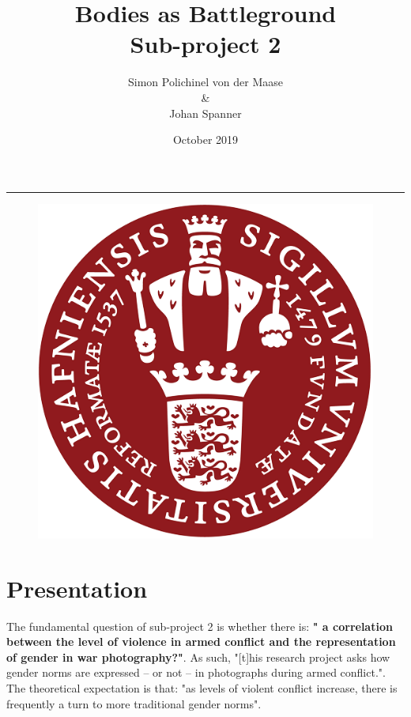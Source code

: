 \documentclass[a4paper]{article}
\title{\textbf{Bodies as Battleground} \\ Sub-project 2}
\author{Simon Polichinel von der Maase \\ \& \\ Johan Spanner}
\date{October 2019}
\begin{document}
	\begin{titlepage}
		\maketitle
		\noindent\rule{\linewidth}{0.4pt}
		\begin{figure}[h]
			\centering
			\includegraphics[scale=0.32]{KU_logo.png}
		\end{figure}
		\thispagestyle{empty} %
	\end{titlepage}
    \tableofcontents
\pagebreak


\section{Presentation}

The fundamental question of sub-project 2 is whether there is: \textbf{" a correlation between the level of violence in armed conflict and the representation of gender in war photography?"}. As such, "[t]his research project asks how gender norms are expressed -- or not -- in photographs during armed conflict.". The theoretical expectation is that: "as levels of violent conflict increase, there is frequently a turn to more traditional gender norms". \par
\end{document}
